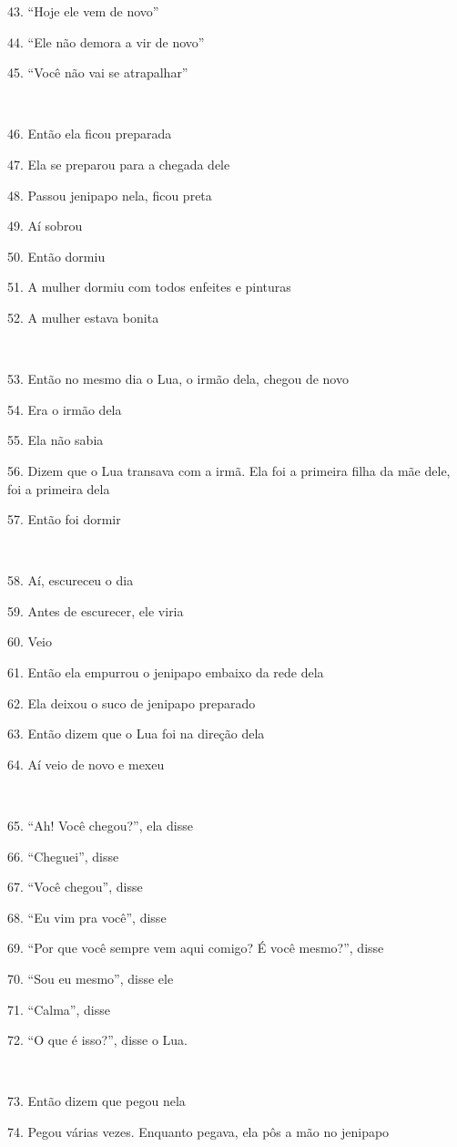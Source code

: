 43. ``Hoje ele vem de novo''

44. ``Ele não demora a vir de novo''

45. ``Você não vai se atrapalhar''

~

46. Então ela ficou preparada

47. Ela se preparou para a chegada dele

48. Passou jenipapo nela, ficou preta

49. Aí sobrou

50. Então dormiu

51. A mulher dormiu com todos enfeites e pinturas

52. A mulher estava bonita

~

53. Então no mesmo dia o Lua, o irmão dela, chegou de novo

54. Era o irmão dela

55. Ela não sabia

56. Dizem que o Lua transava com a irmã. Ela foi a primeira filha da mãe
dele, foi a primeira dela

57. Então foi dormir

~

58. Aí, escureceu o dia

59. Antes de escurecer, ele viria

60. Veio

61. Então ela empurrou o jenipapo embaixo da rede dela

62. Ela deixou o suco de jenipapo preparado

63. Então dizem que o Lua foi na direção dela

64. Aí veio de novo e mexeu

~

65. ``Ah! Você chegou?'', ela disse

66. ``Cheguei'', disse

67. ``Você chegou'', disse

68. ``Eu vim pra você'', disse

69. ``Por que você sempre vem aqui comigo? É você mesmo?'', disse

70. ``Sou eu mesmo'', disse ele

71. ``Calma'', disse

72. ``O que é isso?'', disse o Lua.

~

73. Então dizem que pegou nela

74. Pegou várias vezes. Enquanto pegava, ela pôs a mão no jenipapo

